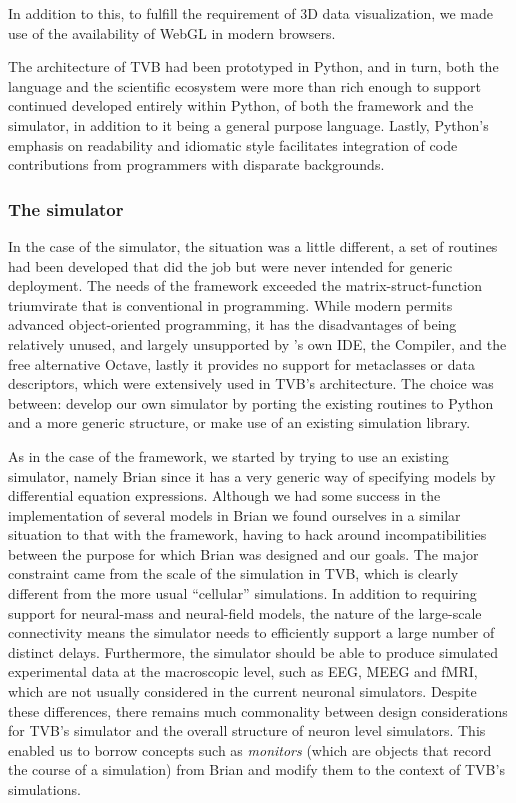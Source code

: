 In addition to this, to fulfill the requirement of 3D data visualization, we 
made use of the availability of WebGL in modern browsers.

The architecture of TVB had been prototyped in Python, and in turn, both the
language and the scientific ecosystem were more than rich enough to support
continued developed entirely within Python, of both the framework and the
simulator, in addition to it being a general purpose language. Lastly, Python's
emphasis on readability and idiomatic style facilitates integration of 
code contributions from programmers with disparate backgrounds.


\subsubsection{The simulator}

In the case of the simulator, the situation was a little different, 
a set of \matlab{} routines had been developed that did the job but were never
intended for generic deployment. The needs of the framework exceeded the 
matrix-struct-function triumvirate that is conventional in \matlab{} 
programming. While modern \matlab{} permits advanced object-oriented 
programming, it has the disadvantages of being relatively unused, and 
largely unsupported by \matlab{}'s own IDE, the \matlab{} Compiler, and the 
free alternative Octave, lastly it provides no support for metaclasses or 
data descriptors, which were extensively used in TVB's architecture. The choice
was between: develop our own simulator by porting the existing \matlab{} 
routines to Python and a more generic structure, or make use of an existing
simulation library. 

As in the case of the framework, we started by trying to use an existing 
simulator, namely Brian \cite{Goodman_2009} since it has a very generic way of
specifying models by differential equation expressions. Although we had some 
success in the implementation of several models in Brian we found ourselves in
a similar situation to that with the framework, having to hack around 
incompatibilities between the purpose for which Brian was designed and our 
goals. The major constraint came from the scale of the simulation in 
TVB, which is clearly different from the more usual ``cellular'' simulations.
In addition to requiring support for neural-mass and neural-field models, the
nature of the large-scale connectivity means the simulator needs to efficiently
support a large number of distinct delays. Furthermore, the simulator should be
able to produce simulated experimental data at the macroscopic level, such as 
EEG, MEEG and fMRI, which are not usually considered in the current neuronal 
simulators. Despite these differences, there remains much commonality between 
design considerations for TVB's simulator and the overall structure of neuron 
level simulators. This enabled us to borrow concepts such as \emph{monitors}
(which are objects that record the course of a simulation) from Brian and modify
them to the context of TVB's simulations.


